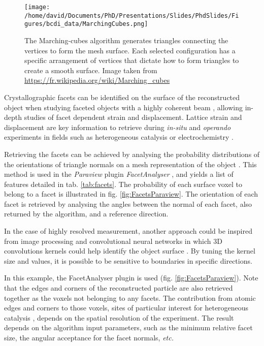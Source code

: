 \begin{figure}[!htb]
    \centering
    \texttt{[image: /home/david/Documents/PhD/Presentations/Slides/PhdSlides/Figures/bcdi\_data/MarchingCubes.png]}
    \caption{
    The Marching-cubes algorithm generates triangles connecting the vertices to form the mesh surface.
    Each selected configuration has a specific arrangement of vertices that dictate how to form triangles to create a smooth surface.
    Image taken from \url{https://fr.wikipedia.org/wiki/Marching_cubes}
    }
    \label{fig:MarchingCubes}
\end{figure}

Crystallographic facets can be identified on the surface of the reconstructed object when studying faceted objects with a highly coherent beam \parencite{Richard2018}, allowing in-depth studies of facet dependent strain and displacement.
Lattice strain and displacement are key information to retrieve during \textit{in-situ} and \textit{operando} experiments in fields such as heterogeneous catalysis \parencite{Ulvestad2016, Kim2018, Fernandez2019, Abuin2019, Kim2019, Kawaguchi2019, Suzana2019, Choi2020, Passos2020,  Kim2021, Carnis2021, Dupraz2022} or electrochemistry \parencite{Ulvestad2015a, Bjorling2019, Vicente2021, Kawaguchi2021, Carnis2021b, Atlan2023}.

Retrieving the facets can be achieved by analysing the probability distributions of the orientations of triangle normals on a mesh representation of the object \parencite{Grothausmann2012}.
This method is used in the \textit{Paraview} plugin \textit{FacetAnalyser} \parencite{Grothausmann2015}, and yields a list of features detailed in tab. \ref{tab:facets}.
The probability of each surface voxel to belong to a facet is illustrated in fig. \ref{fig:FacetsParaview}.
The orientation of each facet is retrieved by analysing the angles between the normal of each facet, also returned by the algorithm, and a reference direction.

In the case of highly resolved measurement, another approach could be inspired from  image processing and convolutional neural networks in which 3D convolutions kernels could help identify the object surface \parencite{RaschkaMirjalili2019}.
By tuning the kernel size and values, it is possible to be sensitive to boundaries in specific directions.

In this example, the FacetAnalyser plugin is used (fig. \ref{fig:FacetsParaview}).
Note that the edges and corners of the reconstructed particle are also retrieved together as the voxels not belonging to any facets.
The contribution from atomic edges and corners to those voxels, sites of particular interest for heterogeneous catalysis \parencite{Taylor1925}, depends on the spatial resolution of the experiment.
The result depends on the algorithm input parameters, such as the minimum relative facet size, the angular acceptance for the facet normals, \textit{etc.}

